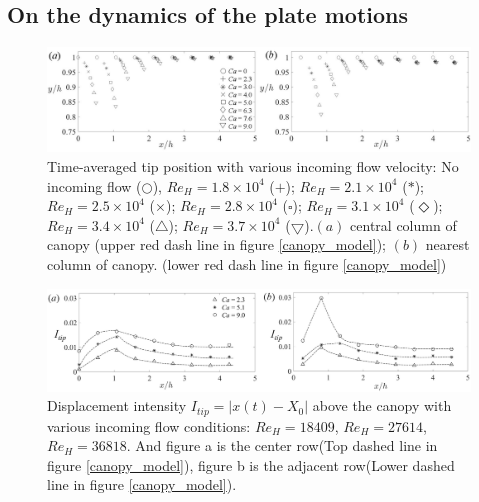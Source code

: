 \documentclass[lineno,authoryear]{FLO_v1}%
\theoremstyle{definition}
\begin{document}
 \subsection{On the dynamics of the plate motions}

\begin{figure}
	\centerline{\includegraphics[width=\textwidth]{Bending}}
	\caption{Time-averaged tip position with various incoming flow velocity: No incoming flow ($\bigcirc$), $Re_H = 1.8 \times 10^4$ ($+$); $Re_H = 2.1 \times 10^4$ ($*$); $Re_H = 2.5 \times 10^4$ ($\times$); $Re_H = 2.8 \times 10^4$ ($\square$); $Re_H = 3.1 \times 10^4$ ($\Diamond$); $Re_H =3.4 \times 10^4$ ($\bigtriangleup$); $Re_H =3.7 \times 10^4$ ($\bigtriangledown$).$(a)$ central column of canopy (upper red dash line in figure \ref{canopy_model}); $(b)$  nearest column of canopy. (lower red dash line in figure \ref{canopy_model})}
	\label{average_tip}
\end{figure}




 

\begin{figure}[]
	\centerline{\includegraphics[width=1\textwidth]{I}}
	\caption{Displacement intensity $I_{tip} = |x(t) - X_0|$ above the canopy  with various incoming flow conditions: $Re_H = 18409$, $Re_H = 27614$, $Re_H = 36818$. And figure a is the center row(Top dashed line in figure \ref{canopy_model}), figure b is the adjacent row(Lower dashed line in figure \ref{canopy_model}). }
	\label{intensity}
\end{figure}
\end{document}
